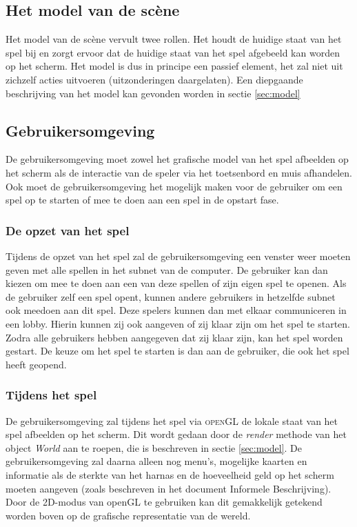 \documentclass[a4paper,11pt, twoside]{article}
\begin{document}
    \subsection{Het model van de sc\`ene}
    Het model van de sc\`ene vervult twee rollen. Het houdt de huidige staat van het spel bij en zorgt ervoor dat de huidige staat van het spel afgebeeld kan worden op het scherm. Het model is dus in principe een passief element, het zal niet uit zichzelf acties uitvoeren (uitzonderingen daargelaten). Een diepgaande beschrijving van het model kan gevonden worden in sectie \ref{sec:model}

    \subsection{Gebruikersomgeving}
   	De gebruikersomgeving moet zowel het grafische model van het spel afbeelden op het scherm als de interactie van de speler via het toetsenbord en muis afhandelen. Ook moet de gebruikersomgeving het mogelijk maken voor de gebruiker om een spel op te starten of mee te doen aan een spel in de opstart fase.

    \subsubsection{De opzet van het spel}
    Tijdens de opzet van het spel zal de gebruikersomgeving een venster weer moeten geven met alle spellen in het subnet van de computer. De gebruiker kan dan kiezen om mee te doen aan een van deze spellen of zijn eigen spel te openen. Als de gebruiker zelf een spel opent, kunnen andere gebruikers in hetzelfde subnet ook meedoen aan dit spel. Deze spelers kunnen dan met elkaar communiceren in een lobby. Hierin kunnen zij ook aangeven of zij klaar zijn om het spel te starten. Zodra alle gebruikers hebben aangegeven dat zij klaar zijn, kan het spel worden gestart. De keuze om het spel te starten is dan aan de gebruiker, die ook het spel heeft geopend.

    \subsubsection{Tijdens het spel}
    De gebruikersomgeving zal tijdens het spel via \textsc{openGL} de lokale staat van het spel afbeelden op het scherm. Dit wordt gedaan door de \emph{render} methode van het object \emph{World} aan te roepen, die is beschreven in sectie \ref{sec:model}. De gebruikersomgeving zal daarna alleen nog menu's, mogelijke kaarten en informatie als de sterkte van het harnas en de hoeveelheid geld op het scherm moeten aangeven (zoals beschreven in het document Informele Beschrijving). Door de 2D-modus van openGL te gebruiken kan dit gemakkelijk getekend worden boven op de grafische representatie van de wereld.
\end{document}

